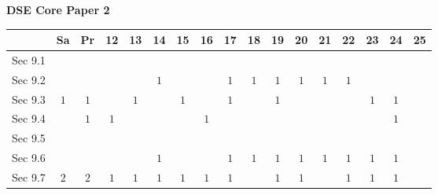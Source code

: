 \documentclass[12pt, a4paper]{article}
\begin{document}
\begin{absolutelynopagebreak}
\begin{center}
\textbf{DSE Core Paper 2}
\end{center}
\begin{center}
\begin{tabular}{|l|c|c|c|c|c|c|c|c|c|c|c|c|c|c|c|c|}
\hline
        & Sa & Pr & 12 & 13 & 14 & 15 & 16 & 17 & 18 & 19 & 20 & 21 & 22 & 23 & 24 & 25 \\\hline\hline
Sec 9.1 &  &  &  &  &  &  &  &  &  &  &  &  &  &  &  &  \\\hline
Sec 9.2 &  &  &  &  &  $1$ &  &  &  $1$ &  $1$ &  $1$ &  $1$ &  $1$ &  $1$ &  &  &  \\\hline
Sec 9.3 &  $1$ &  $1$ &  &  $1$ &  &  $1$ &  &  $1$ &  &  $1$ &  &  &  &  $1$ &  $1$ &  \\\hline
Sec 9.4 &  &  $1$ &  $1$ &  &  &  &  $1$ &  &  &  &  &  &  &  &  $1$ &  \\\hline
Sec 9.5 &  &  &  &  &  &  &  &  &  &  &  &  &  &  &  &  \\\hline
Sec 9.6 &  &  &  &  &  $1$ &  &  &  $1$ &  $1$ &  $1$ &  $1$ &  $1$ &  $1$ &  $1$ &  $1$ &  \\\hline
Sec 9.7 &  $2$ &  $2$ &  $1$ &  $1$ &  $1$ &  $1$ &  $1$ &  $1$ &  &  $1$ &  $1$ &  &  $1$ &  $1$ &  $1$ &  \\\hline
\end{tabular}
\end{center}
\end{absolutelynopagebreak}
\end{document}
